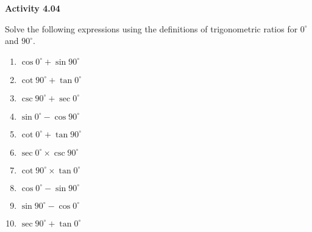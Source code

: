 \vspace{0.3ex}
\noindent\textbf{Activity 4.04}

\vspace{0.2ex}

Solve the following expressions using the definitions of trigonometric ratios for \( 0^\circ \) and \( 90^\circ \).
\begin{multicols}{2}
\begin{enumerate}
    \item \( \cos 0^\circ + \sin 90^\circ \)
    \item \( \cot 90^\circ + \tan 0^\circ \)
    \item \( \csc 90^\circ + \sec 0^\circ \)
    \item \( \sin 0^\circ - \cos 90^\circ \)
    \item \( \cot 0^\circ + \tan 90^\circ \)
    \item \( \sec 0^\circ \times \csc 90^\circ \)
    \item \( \cot 90^\circ \times \tan 0^\circ \)
    \item \( \cos 0^\circ - \sin 90^\circ \)
    \item \( \sin 90^\circ - \cos 0^\circ \)
    \item \( \sec 90^\circ + \tan 0^\circ \)
\end{enumerate}
\end{multicols}
